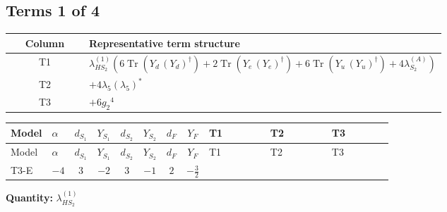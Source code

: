 \documentclass[8pt]{article}
\begin{document}
\begin{landscape}
\subsection*{Terms 1 of 4}
\begin{center}
\begin{tabular}{@{}c >{\raggedright\arraybackslash}p{0.82\linewidth}@{}}
\toprule
Column & Representative term structure \\
\midrule
T1 & \(\displaystyle {\lambda_{HS_2}^{(1)}} (6 \operatorname{Tr}\!\left({Y_d}\,\left({Y_d}\right)^{\dagger}\right)+2 \operatorname{Tr}\!\left({Y_e}\,\left({Y_e}\right)^{\dagger}\right)+6 \operatorname{Tr}\!\left({Y_u}\,\left({Y_u}\right)^{\dagger}\right)+4 {\lambda_{S_2}^{(A)}})\) \\
\midrule
T2 & \(\displaystyle +4 {\lambda_5} \left({\lambda_5}\right)^{*}\) \\
\midrule
T3 & \(\displaystyle +6 {g_2}^4\) \\
\midrule
\bottomrule
\end{tabular}
\end{center}
\smallskip
\tiny
\begin{longtable}{@{}llcccccc >{\raggedright\arraybackslash}p{0.21\linewidth} >{\raggedright\arraybackslash}p{0.21\linewidth} >{\raggedright\arraybackslash}p{0.21\linewidth}@{}}
\toprule
Model & $\alpha$ & $d_{S_1}$ & $Y_{S_1}$ & $d_{S_2}$ & $Y_{S_2}$ & $d_F$ & $Y_F$ & T1 & T2 & T3 \\
\midrule
\endfirsthead
\toprule
Model & $\alpha$ & $d_{S_1}$ & $Y_{S_1}$ & $d_{S_2}$ & $Y_{S_2}$ & $d_F$ & $Y_F$ & T1 & T2 & T3 \\
\midrule
\endhead
T3-E & $-4$ & $3$ & $-2$ & $3$ & $-1$ & $2$ & $-\frac{3}{2}$ & \scriptsize\adjustbox{max width=\linewidth}{$\begin{gathered} {\lambda_{HS_2}^{(1)}} (6 \operatorname{Tr}\!\left({Y_d}\,\left({Y_d}\right)^{\dagger}\right)+2 \operatorname{Tr}\!\left({Y_e}\,\left({Y_e}\right)^{\dagger}\right)+6 \operatorname{Tr}\!\left({Y_u}\,\left({Y_u}\right)^{\dagger}\right)+4 {\lambda_{S_2}^{(A)}})\end{gathered}$} & \scriptsize\adjustbox{max width=\linewidth}{$\begin{gathered} +4 {\lambda_5} \left({\lambda_5}\right)^{*}\end{gathered}$} & \scriptsize\adjustbox{max width=\linewidth}{$\begin{gathered} +6 {g_2}^4\end{gathered}$} \\
\midrule
\bottomrule
\end{longtable}
\clearpage
\noindent\textbf{Quantity: }$\lambda_{HS_2}^{(1)}$\par\smallskip

\end{landscape}
\end{document}
